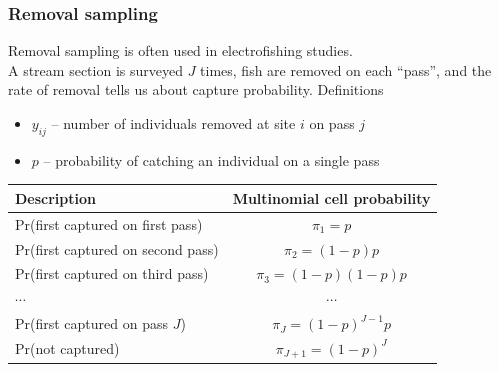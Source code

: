 \documentclass[color=usenames,dvipsnames]{beamer}\usepackage[]{graphicx}\usepackage[]{xcolor}
\begin{document}
\begin{frame}
  \frametitle{Removal sampling}
  \small
  Removal sampling is often used in electrofishing studies. \\
  \pause
  \vfill
  A stream section is surveyed $J$ times, fish are removed on each
  ``pass'', and the rate of removal tells us about capture
  probability.  
  \pause
  \vfill
  Definitions
  \begin{itemize}
    \setlength\itemsep{1pt}
    \item $y_{ij}$ -- number of individuals removed at site $i$ on pass $j$
    \item $p$ -- probability of catching an individual on a single pass
  \end{itemize}
  \pause \vfill
  \footnotesize
  \begin{tabular}{lc}
    \hline
    \centering
    Description                       & Multinomial cell probability \\
    \hline
    Pr(first captured on first pass)  & $\pi_1 = p$                  \\
    Pr(first captured on second pass) & $\pi_2 = (1-p)p$             \\
    Pr(first captured on third pass)  & $\pi_3 = (1-p)(1-p)p$        \\
    {\centering $\cdots$}             & $\cdots$                     \\
    Pr(first captured on pass $J$)    & $\pi_J = (1-p)^{J-1}p$       \\
    Pr(not captured)                  & $\pi_{J+1} = (1-p)^J$          \\
    \hline
  \end{tabular}
\end{frame}
\end{document}
